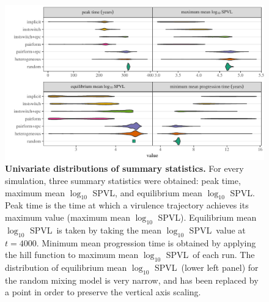 \documentclass[10pt,letterpaper]{article}
\newcommand{\Lspvl}{$\log_{10}$ SPVL}
\begin{document}
\begin{figure}[!ht]
\includegraphics[width=\textwidth]{../figures/fig3.pdf}
\caption{{\bf Univariate distributions of summary statistics.}
For every simulation, three summary statistics were obtained: peak time, maximum mean \Lspvl, and equilibrium mean \Lspvl. 
Peak time is the time at which a virulence trajectory achieves its maximum value (maximum mean \Lspvl).
Equilibrium mean \Lspvl\ is taken by taking the mean \Lspvl\ value at $t = 4000$.
Minimum mean progression time is obtained by applying the hill function to maximum mean \Lspvl\ of each run.
The distribution of equilibrium mean \Lspvl\
(lower left panel) for the random mixing model is very narrow, and has been replaced by a point in order to preserve the vertical axis scaling.}
\label{fig:unidist}
\end{figure}
\end{document}

